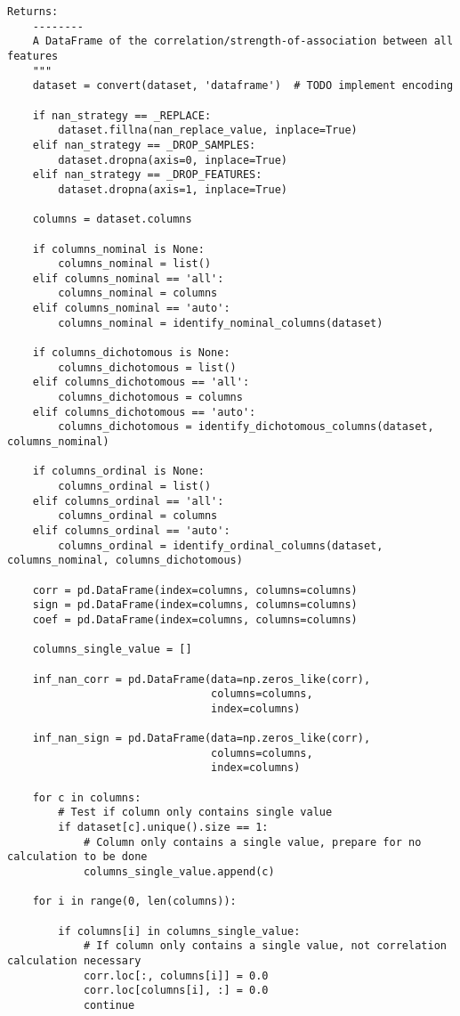 \begin{lstlisting}[basicstyle=\tiny, style=py, caption={Implementation of \textit{compute correlations}}, label=lst:compute_correlation]
    Returns:
    --------
    A DataFrame of the correlation/strength-of-association between all features
    """
    dataset = convert(dataset, 'dataframe')  # TODO implement encoding
    
    if nan_strategy == _REPLACE:
        dataset.fillna(nan_replace_value, inplace=True)
    elif nan_strategy == _DROP_SAMPLES:
        dataset.dropna(axis=0, inplace=True)
    elif nan_strategy == _DROP_FEATURES:
        dataset.dropna(axis=1, inplace=True)
    
    columns = dataset.columns
    
    if columns_nominal is None:
        columns_nominal = list()
    elif columns_nominal == 'all':
        columns_nominal = columns
    elif columns_nominal == 'auto':
        columns_nominal = identify_nominal_columns(dataset)
    
    if columns_dichotomous is None:
        columns_dichotomous = list()
    elif columns_dichotomous == 'all':
        columns_dichotomous = columns
    elif columns_dichotomous == 'auto':
        columns_dichotomous = identify_dichotomous_columns(dataset, columns_nominal)
    
    if columns_ordinal is None:
        columns_ordinal = list()
    elif columns_ordinal == 'all':
        columns_ordinal = columns
    elif columns_ordinal == 'auto':
        columns_ordinal = identify_ordinal_columns(dataset, columns_nominal, columns_dichotomous)
    
    corr = pd.DataFrame(index=columns, columns=columns)
    sign = pd.DataFrame(index=columns, columns=columns)
    coef = pd.DataFrame(index=columns, columns=columns)
    
    columns_single_value = []
    
    inf_nan_corr = pd.DataFrame(data=np.zeros_like(corr),
                                columns=columns,
                                index=columns)
    
    inf_nan_sign = pd.DataFrame(data=np.zeros_like(corr),
                                columns=columns,
                                index=columns)
    
    for c in columns:
        # Test if column only contains single value
        if dataset[c].unique().size == 1:
            # Column only contains a single value, prepare for no calculation to be done
            columns_single_value.append(c)
    
    for i in range(0, len(columns)):
    
        if columns[i] in columns_single_value:
            # If column only contains a single value, not correlation calculation necessary
            corr.loc[:, columns[i]] = 0.0
            corr.loc[columns[i], :] = 0.0
            continue
    

\end{lstlisting}
